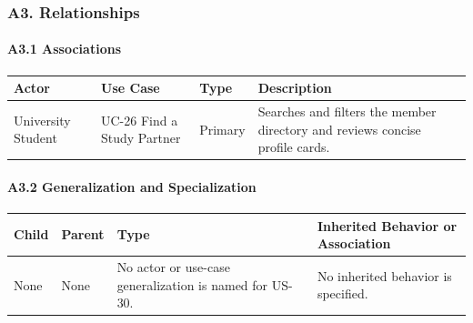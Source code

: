 \documentclass[12pt]{article}
\renewcommand{\baselinestretch}{1.5}
\begin{document}
\hypertarget{sec:a3-relationships}{}
\subsubsection*{A3. Relationships}
\par\medskip

\hypertarget{sec:a3-1-associations}{}
\paragraph*{A3.1 Associations}
\par\medskip

\begingroup
\small
\renewcommand{\baselinestretch}{1.0}\selectfont
\renewcommand{\arraystretch}{1.15}
\setlength{\tabcolsep}{6pt}
\begin{longtable}{|>{\raggedright\arraybackslash}p{}|>{\raggedright\arraybackslash}p{}|>{\raggedright\arraybackslash}p{}|>{\raggedright\arraybackslash}p{}|}
\hline
\textbf{Actor} & \textbf{Use Case} & \textbf{Type} & \textbf{Description} \\ \hline
\endhead
University Student & UC-26 Find a Study Partner & Primary & Searches and filters the member directory and reviews concise profile cards. \\ \hline
\end{longtable}
\endgroup
\par\medskip

\hypertarget{sec:a3-2-generalization-and-specialization}{}
\paragraph*{A3.2 Generalization and Specialization}
\par\medskip

\begingroup
\small
\renewcommand{\baselinestretch}{1.0}\selectfont
\renewcommand{\arraystretch}{1.15}
\setlength{\tabcolsep}{6pt}
\begin{longtable}{|>{\raggedright\arraybackslash}p{}|>{\raggedright\arraybackslash}p{}|>{\raggedright\arraybackslash}p{}|>{\raggedright\arraybackslash}p{}|}
\hline
\textbf{Child} & \textbf{Parent} & \textbf{Type} & \textbf{Inherited Behavior or Association} \\ \hline
\endhead
None & None & No actor or use-case generalization is named for US-30. & No inherited behavior is specified. \\ \hline
\end{longtable}
\endgroup
\par\medskip
\end{document}
